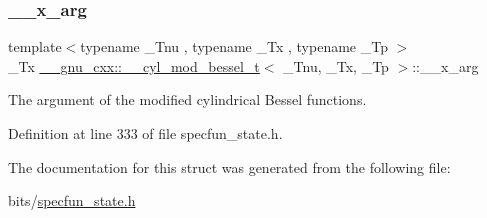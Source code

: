 \subsubsection{\texorpdfstring{\+\_\+\+\_\+x\+\_\+arg}{\_\_x\_arg}}
{\footnotesize\ttfamily template$<$typename \+\_\+\+Tnu , typename \+\_\+\+Tx , typename \+\_\+\+Tp $>$ \\
\+\_\+\+Tx \hyperlink{struct____gnu__cxx_1_1____cyl__mod__bessel__t}{\+\_\+\+\_\+gnu\+\_\+cxx\+::\+\_\+\+\_\+cyl\+\_\+mod\+\_\+bessel\+\_\+t}$<$ \+\_\+\+Tnu, \+\_\+\+Tx, \+\_\+\+Tp $>$\+::\+\_\+\+\_\+x\+\_\+arg}



The argument of the modified cylindrical Bessel functions. 



Definition at line 333 of file specfun\+\_\+state.\+h.



The documentation for this struct was generated from the following file\+:\begin{DoxyCompactItemize}
\item 
bits/\hyperlink{specfun__state_8h}{specfun\+\_\+state.\+h}\end{DoxyCompactItemize}

